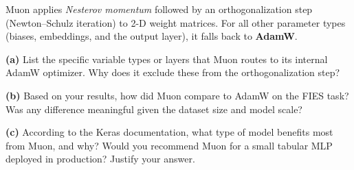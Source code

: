 \documentclass[12pt,a4paper]{article}
\begin{document}
\begin{tcolorbox}[colback=lightblue!40, colframe=myColorB,
  title={\textbf{Question 9 — Muon Optimizer} \hfill \normalfont(10 pts)},
  fonttitle=\normalsize\bfseries, breakable]

Muon applies \emph{Nesterov momentum} followed by an orthogonalization step
(Newton--Schulz iteration) to 2-D weight matrices. For all other parameter types
(biases, embeddings, and the output layer), it falls back to \textbf{AdamW}.

\textbf{(a)} List the specific variable types or layers that Muon routes to
its internal AdamW optimizer. Why does it exclude these from the orthogonalization step?

\textbf{(b)} Based on your results, how did Muon compare to AdamW on the FIES
task? Was any difference meaningful given the dataset size and model scale?

\textbf{(c)} According to the Keras documentation, what type of model benefits
most from Muon, and why? Would you recommend Muon for a small tabular MLP
deployed in production? Justify your answer.
\end{tcolorbox}
\end{document}
